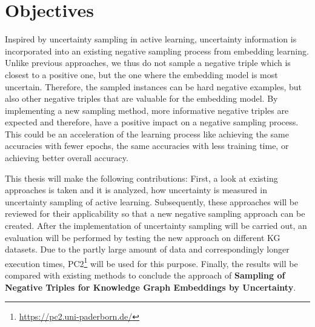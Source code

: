 \section{Objectives}
\label{sec:objectives}

Inspired by uncertainty sampling in active learning,  uncertainty information is incorporated into an existing negative sampling process from embedding learning.
Unlike previous approaches, we thus do not sample a negative triple which is closest to a positive one, but the one where the embedding model is most uncertain.
Therefore, the sampled instances can be hard negative examples, but also other negative triples that are valuable for the embedding model.
By implementing a new sampling method, more informative negative triples are expected and therefore, have a positive impact on a negative sampling process.
This could be an acceleration of the learning process like achieving the same accuracies with fewer epochs, the same accuracies with less training time, or achieving better overall accuracy.

This thesis will make the following contributions:
First, a look at existing approaches is taken and it is analyzed, how uncertainty is measured in uncertainty sampling of active learning.
Subsequently, these approaches will be reviewed for their applicability so that a new negative sampling approach can be created.
After the implementation of uncertainty sampling will be carried out, an evaluation will be performed by testing the new approach on different \ac{KG} datasets.
Due to the partly large amount of data and correspondingly longer execution times, \ac{PC2}\footnote{\url{https://pc2.uni-paderborn.de/}} will be used for this purpose.
Finally, the results will be compared with existing methods to conclude the approach of \textbf{Sampling of Negative Triples for Knowledge Graph Embeddings by Uncertainty}.








